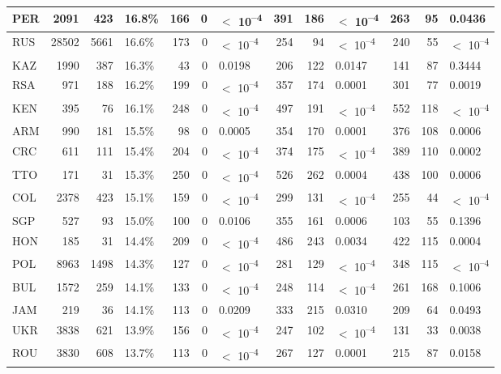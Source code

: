 \begin{tabular}{l|r|r|l|r|r|l|r|r|l|r|r|l}
\hline
PER & 2091 & 423 & 16.8\% & 166 & 0 & $<$ 10\textsuperscript{--4} & 391 & 186 & $<$ 10\textsuperscript{--4} & 263 & 95 & 0.0436\\
\hline
RUS & 28502 & 5661 & 16.6\% & 173 & 0 & $<$ 10\textsuperscript{--4} & 254 & 94 & $<$ 10\textsuperscript{--4} & 240 & 55 & $<$ 10\textsuperscript{--4}\\
\hline
KAZ & 1990 & 387 & 16.3\% & 43 & 0 & 0.0198 & 206 & 122 & 0.0147 & 141 & 87 & 0.3444\\
\hline
RSA & 971 & 188 & 16.2\% & 199 & 0 & $<$ 10\textsuperscript{--4} & 357 & 174 & 0.0001 & 301 & 77 & 0.0019\\
\hline
KEN & 395 & 76 & 16.1\% & 248 & 0 & $<$ 10\textsuperscript{--4} & 497 & 191 & $<$ 10\textsuperscript{--4} & 552 & 118 & $<$ 10\textsuperscript{--4}\\
\hline
ARM & 990 & 181 & 15.5\% & 98 & 0 & 0.0005 & 354 & 170 & 0.0001 & 376 & 108 & 0.0006\\
\hline
CRC & 611 & 111 & 15.4\% & 204 & 0 & $<$ 10\textsuperscript{--4} & 374 & 175 & $<$ 10\textsuperscript{--4} & 389 & 110 & 0.0002\\
\hline
TTO & 171 & 31 & 15.3\% & 250 & 0 & $<$ 10\textsuperscript{--4} & 526 & 262 & 0.0004 & 438 & 100 & 0.0006\\
\hline
COL & 2378 & 423 & 15.1\% & 159 & 0 & $<$ 10\textsuperscript{--4} & 299 & 131 & $<$ 10\textsuperscript{--4} & 255 & 44 & $<$ 10\textsuperscript{--4}\\
\hline
SGP & 527 & 93 & 15.0\% & 100 & 0 & 0.0106 & 355 & 161 & 0.0006 & 103 & 55 & 0.1396\\
\hline
HON & 185 & 31 & 14.4\% & 209 & 0 & $<$ 10\textsuperscript{--4} & 486 & 243 & 0.0034 & 422 & 115 & 0.0004\\
\hline
POL & 8963 & 1498 & 14.3\% & 127 & 0 & $<$ 10\textsuperscript{--4} & 281 & 129 & $<$ 10\textsuperscript{--4} & 348 & 115 & $<$ 10\textsuperscript{--4}\\
\hline
BUL & 1572 & 259 & 14.1\% & 133 & 0 & $<$ 10\textsuperscript{--4} & 248 & 114 & $<$ 10\textsuperscript{--4} & 261 & 168 & 0.1006\\
\hline
JAM & 219 & 36 & 14.1\% & 113 & 0 & 0.0209 & 333 & 215 & 0.0310 & 209 & 64 & 0.0493\\
\hline
UKR & 3838 & 621 & 13.9\% & 156 & 0 & $<$ 10\textsuperscript{--4} & 247 & 102 & $<$ 10\textsuperscript{--4} & 131 & 33 & 0.0038\\
\hline
ROU & 3830 & 608 & 13.7\% & 113 & 0 & $<$ 10\textsuperscript{--4} & 267 & 127 & 0.0001 & 215 & 87 & 0.0158\\

\end{tabular}
